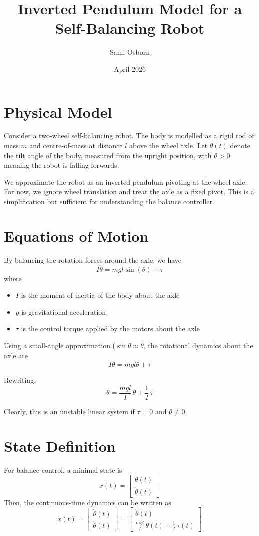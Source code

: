 \documentclass[11pt,a4paper]{article}
\author{Sami Osborn}
\title{Inverted Pendulum Model for a Self-Balancing Robot}
\date{April 2026}
\begin{document}
\maketitle

\section{Physical Model}

Consider a two-wheel self-balancing robot. 
The body is modelled as a rigid rod of mass \(m\) and centre-of-mass at distance \(l\) above the wheel axle. 
Let \( \theta(t) \) denote the tilt angle of the body, measured from the upright position, with \(\theta>0\) meaning the robot is falling forwards.

We approximate the robot as an inverted pendulum pivoting at the wheel axle. For now, we ignore wheel translation and treat the axle as a fixed pivot. 
This is a simplification but sufficient for understanding the balance controller.

\section{Equations of Motion}
By balancing the rotation forces around the axle, we have
\[
I \ddot{\theta} = m g l \sin(\theta) + \tau
\]
where
\begin{itemize}
  \item \(I\) is the moment of inertia of the body about the axle
  \item \(g\) is gravitational acceleration
  \item \(\tau\) is the control torque applied by the motors about the axle
\end{itemize}

Using a small-angle approximation (\(\sin \theta \approx \theta\), the rotational dynamics about the axle are
\[
I \ddot{\theta} = m g l \theta + \tau
\]

Rewriting,
\[
\ddot{\theta} = \frac{m g l}{I}\,\theta + \frac{1}{I}\,\tau
\]

Clearly, this is an unstable linear system if \(\tau = 0\) and \(\theta \neq 0\).

\section{State Definition}

For balance control, a minimal state is
\[
x(t) = \begin{bmatrix} \theta(t) \\ \dot{\theta}(t) \end{bmatrix}
\]
Then, the continuous-time dynamics can be written as
\[
\dot{x}(t) =
\begin{bmatrix}
\dot{\theta}(t) \\
\ddot{\theta}(t)
\end{bmatrix}
=
\begin{bmatrix}
\dot{\theta}(t) \\
\frac{m g l}{I}\,\theta(t) + \frac{1}{I}\,\tau(t)
\end{bmatrix}
\]
\end{document}
